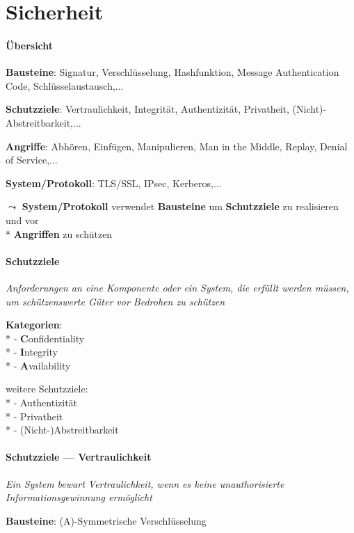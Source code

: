 \section{Sicherheit}

\paragraph{Übersicht}
\begin{items}
  \item \textbf{Bausteine}: Signatur, Verschlüsselung, Hashfunktion, Message Authentication Code, Schlüsselaustausch,...
  \item \textbf{Schutzziele}: Vertraulichkeit, Integrität, Authentizität, Privatheit, (Nicht)-Abstreitbarkeit,...
  \item \textbf{Angriffe}: Abhören, Einfügen, Manipulieren, Man in the Middle, Replay, Denial of Service,...
  \item \textbf{System/Protokoll}: TLS/SSL, IPsec, Kerberos,...
  \item \( \leadsto \) \textbf{System/Protokoll} verwendet \textbf{Bausteine} um \textbf{Schutzziele} zu realisieren und vor \\* \phantom{.} \textbf{Angriffen} zu schützen
\end{items}

\paragraph{Schutzziele}
\begin{items}
  \item \emph{Anforderungen an eine Komponente oder ein System, die erfüllt werden müssen, um schützenswerte Güter vor Bedrohen zu schützen}
  \item \textbf{Kategorien}: \\*
    - \textbf{C}onfidentiality \\*
    - \textbf{I}ntegrity \\*
    - \textbf{A}vailability
  \item weitere Schutzziele: \\*
    - Authentizität \\*
    - Privatheit \\*
    - (Nicht-)Abstreitbarkeit
\end{items}

\paragraph{Schutzziele --- Vertraulichkeit}
\begin{items}
  \item \emph{Ein System bewart Vertraulichkeit, wenn es keine unauthorisierte Informationsgewinnung ermöglicht}
  \item \textbf{Bausteine}: (A)-Symmetrische Verschlüsselung
\end{items}

